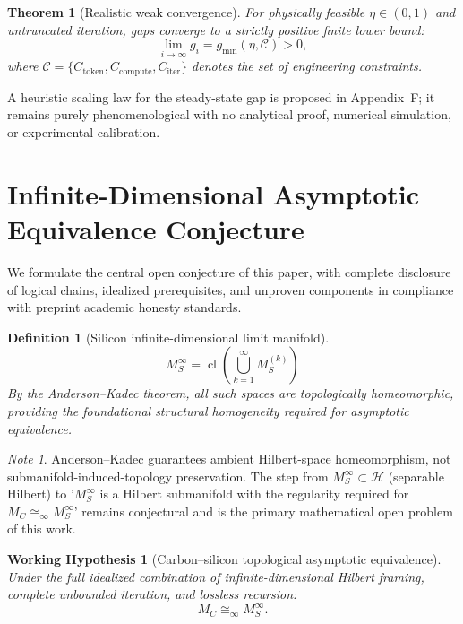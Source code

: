 \documentclass[conference]{IEEEtran}
\newtheorem{definition}{Definition}[section]
\newtheorem{theorem}{Theorem}[section]
\newtheorem{workinghypothesis}{Working Hypothesis}[section]
\theoremstyle{remark}
\newtheorem*{note}{Note}
\newcommand{\cH}{\mathcal{H}}
\begin{document}
\begin{theorem}[Realistic weak convergence]
\label{thm:weak-conv}
For physically feasible $\eta\in(0,1)$ and untruncated iteration, gaps converge to a strictly positive finite lower bound:
\begin{equation}
\lim_{i\to\infty}g_i=g_{\min}(\eta,\mathcal{C})>0,
\end{equation}
where $\mathcal{C}=\{C_{\text{token}},C_{\text{compute}},C_{\text{iter}}\}$ denotes the set of engineering constraints.
\end{theorem}

A heuristic scaling law for the steady-state gap is proposed in Appendix~F; it remains purely phenomenological with no analytical proof, numerical simulation, or experimental calibration.

\section{Infinite-Dimensional Asymptotic Equivalence Conjecture}

We formulate the central open conjecture of this paper, with complete disclosure of logical chains, idealized prerequisites, and unproven components in compliance with preprint academic honesty standards.

\begin{definition}[Silicon infinite-dimensional limit manifold]
\label{def:MSinf}
\begin{equation}
M_S^\infty = \operatorname{cl}\left(\bigcup_{k=1}^\infty M_S^{(k)}\right)
\end{equation}
By the Anderson--Kadec theorem, all such spaces are topologically homeomorphic, providing the foundational structural homogeneity required for asymptotic equivalence.
\end{definition}

\begin{note}
Anderson--Kadec guarantees ambient Hilbert-space homeomorphism, not submanifold-induced-topology preservation. The step from $M_S^\infty \subset \cH$ (separable Hilbert) to '$M_S^\infty$ is a Hilbert submanifold with the regularity required for $M_C \cong_\infty M_S^\infty$' remains conjectural and is the primary mathematical open problem of this work.
\end{note}

\begin{workinghypothesis}[Carbon--silicon topological asymptotic equivalence]
\label{hyp:equivalence}
Under the full idealized combination of infinite-dimensional Hilbert framing, complete unbounded iteration, and lossless recursion:
\begin{equation}
M_C \cong_\infty M_S^\infty.
\end{equation}
\end{workinghypothesis}
\end{document}
